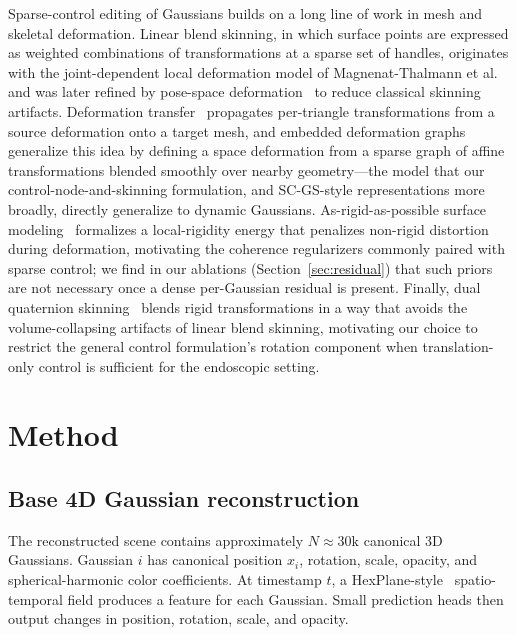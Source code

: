 \documentclass[AMA,Times1COL]{WileyNJDv5} %
\begin{document}
Sparse-control editing of Gaussians builds on a long line of work in mesh and skeletal deformation. Linear blend skinning, in which surface points are expressed as weighted combinations of transformations at a sparse set of handles, originates with the joint-dependent local deformation model of Magnenat-Thalmann et al.~\cite{magnenatthalmann1988jld} and was later refined by pose-space deformation~\cite{lewis2000posespace} to reduce classical skinning artifacts. Deformation transfer~\cite{sumner2004deformationtransfer} propagates per-triangle transformations from a source deformation onto a target mesh, and embedded deformation graphs~\cite{sumner2007embedded} generalize this idea by defining a space deformation from a sparse graph of affine transformations blended smoothly over nearby geometry---the model that our control-node-and-skinning formulation, and SC-GS-style representations more broadly, directly generalize to dynamic Gaussians. As-rigid-as-possible surface modeling~\cite{sorkine2007arap} formalizes a local-rigidity energy that penalizes non-rigid distortion during deformation, motivating the coherence regularizers commonly paired with sparse control; we find in our ablations (Section~\ref{sec:residual}) that such priors are not necessary once a dense per-Gaussian residual is present. Finally, dual quaternion skinning~\cite{kavan2007dualquaternion,kavan2008geometricskinning} blends rigid transformations in a way that avoids the volume-collapsing artifacts of linear blend skinning, motivating our choice to restrict the general control formulation's rotation component when translation-only control is sufficient for the endoscopic setting.

\section{Method}\label{sec3}

\subsection{Base 4D Gaussian reconstruction}

The reconstructed scene contains approximately $N\approx30\text{k}$ canonical 3D Gaussians. Gaussian $i$ has canonical position $x_i$, rotation, scale, opacity, and spherical-harmonic color coefficients. At timestamp $t$, a HexPlane-style~\cite{cao2023hexplane} spatio-temporal field produces a feature for each Gaussian. Small prediction heads then output changes in position, rotation, scale, and opacity.
\end{document}
